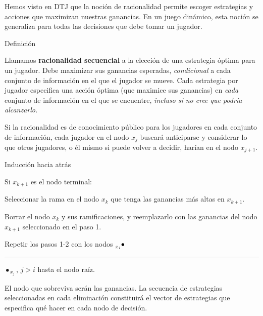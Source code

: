 \documentclass[12pt]{scrartcl}
\newcommand{\linebullet}[2]{$\prescript{}{#1}{\bullet}${\rule[3.5pt]{15pt}{1pt}}$\bullet_{\hspace{2pt}#2}$}
\begin{document}
Hemos visto en DTJ que la noción de racionalidad permite escoger estrategias y acciones que maximizan nuestras ganancias. En un juego dinámico, esta noción se generaliza para todas las decisiones que debe tomar un jugador.

\begin{mybox}{Definición}
	\begin{defi}
		Llamamos \textbf{racionalidad secuencial} a la elección de una estrategia óptima para un jugador. Debe maximizar sus ganancias esperadas, \textit{condicional} a cada conjunto de información en el que el jugador se mueve. Cada estrategia por jugador especifica una acción óptima (que maximice sus ganancias) en \textit{cada} conjunto de información en el que se encuentre, \textit{incluso si no cree que podría alcanzarlo. }
	\end{defi}
	\label{def:def4}
\end{mybox}


Si la racionalidad es de conocimiento público para los jugadores en cada conjunto de información, cada jugador en el nodo $x_j$ buscará anticiparse y considerar lo que otros jugadores, o él mismo si puede volver a decidir, harían en el nodo $x_{j+1}$.  

\begin{mybox}{Inducción hacia atrás}
	
	Si $x_{k+1}$ es el nodo terminal:
	
	\begin{myenum}
		\item Seleccionar la rama en el nodo $x_k$ que tenga las ganancias más altas en $x_{k+1}$. 
		\item Borrar el nodo $x_{k}$ y sus ramificaciones, y reemplazarlo con las ganancias del nodo $x_{k+1}$ seleccionado en el paso 1.
		\item Repetir los pasos 1-2 con los nodos \linebullet{x_i}{x_j}, $j > i$ hasta el nodo raíz. 
		\item El nodo que sobreviva serán las ganancias. La secuencia de estrategias seleccionadas en cada eliminación constituirá el vector de estrategias que especifica qué hacer en cada nodo de decisión.
	\end{myenum}
	    
\end{mybox}
\end{document}
